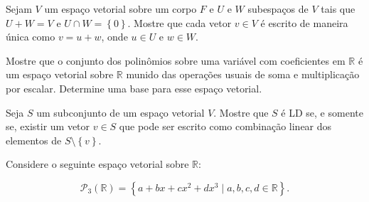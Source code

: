 \begin{questions}
\begin{solutionordottedlines}
  \end{solutionordottedlines}

  \question\label{exercício:2.4}

  Sejam $V$ um espaço vetorial sobre um corpo $F$ e $U$ e $W$
  subespaços de $V$ tais que $U+W=V$ e $U \cap W=\left\{0\right\}$.
  Mostre que cada vetor $v\in V$ é escrito de maneira única como
  $v=u+w$, onde $u\in U$ e $w\in W$.

  \begin{solutionordottedlines}
  \end{solutionordottedlines}

  \question\label{exercício:2.5}

  Mostre que o conjunto dos polinômios sobre uma variável com
  coeficientes em $\mathbb{R}$ é um espaço vetorial sobre
  $\mathbb{R}$ munido das operações usuais de soma e multiplicação
  por escalar.
  Determine uma base para esse espaço vetorial.

  \begin{solutionordottedlines}
  \end{solutionordottedlines}

  \question\label{exercício:2.6}

  Seja $S$ um subconjunto de um espaço vetorial $V$.
  Mostre que $S$ é LD se, e somente se, existir um vetor $v\in S$ que
  pode ser escrito como combinação linear dos elementos de
  $S\setminus\left\{v\right\}$.

  \begin{solutionordottedlines}
  \end{solutionordottedlines}

  \question\label{exercício:2.7}

  Considere o seguinte espaço vetorial sobre $\mathbb{R}$:

  \[
    \mathcal{P}_{3}
    \left(\mathbb{R}\right)=
    \left\{
    a+bx+cx^{2}+dx^{3}\mid
    a,b,c,d\in\mathbb{R}
    \right\}.
  \]

  \begin{parts}
    \part\label{exercício:2.7a}


\end{parts}
\end{questions}
